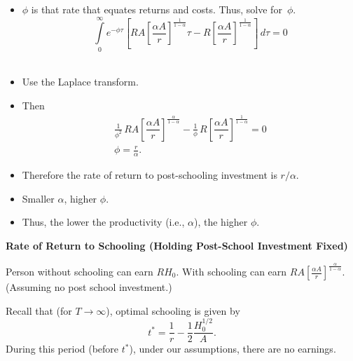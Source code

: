 \documentclass[12pt,compress,handout]{beamer}  %
\begin{document}
\begin{frame}
\begin{itemize}
\item $\phi$ is that rate that equates returns and costs. Thus, solve for~$\phi$.
\begin{equation*}
    \int\limits_{0}^{\infty}
        e^{-\phi \tau}
        \left[
            RA\left[\dfrac{\alpha A}{r}\right]^{\frac{1}{1-\alpha}}\tau
            -
            R\left[\dfrac{\alpha A}{r}\right]^{\frac{1}{1-\alpha}}
        \right]\,d\tau = 0
\end{equation*}\ \\[3mm]
\item Use the Laplace transform.\\[5mm]
\item Then
\begin{gather*}
    \frac{1}{\phi^2}\,RA\left[\dfrac{\alpha A}{r}\right]^{\frac{\alpha}{1-\alpha}}
    -
    \frac{1}{\phi}\,R\left[\dfrac{\alpha A}{r}\right]^{\frac{1}{1-\alpha}}
    = 0\\
    \phi = \frac{r}{\alpha} \text{.}
\end{gather*}
\end{itemize}
\end{frame}

\begin{frame}
\begin{itemize}
\item Therefore the rate of return to post-schooling investment is $r/\alpha$.\\[9mm]
\item Smaller $\alpha$, higher $\phi$.\\[9mm]
\item Thus, the lower the productivity (i.e., $\alpha$), the higher $\phi$.
\end{itemize}
\end{frame}


\begin{frame}
\begin{center}
    \textbf{Rate of Return to Schooling (Holding Post-School Investment Fixed)}
\end{center}

Person without schooling can earn $RH_0$. With schooling can earn
$RA\left[\frac{\alpha A}{r}\right]^{\frac{\alpha}{1-\alpha}}$. (Assuming no
post school investment.)\bigskip

Recall that (for $T\rightarrow\infty$), optimal schooling is given
by
\begin{equation*}
    t^{*} = \frac{1}{r} - \frac{1}{2}\frac{H_0^{1/2}}{A}.
\end{equation*}
During this period (before $t^{*}$), under our assumptions, there are no
earnings.

\end{frame}
\end{document}
